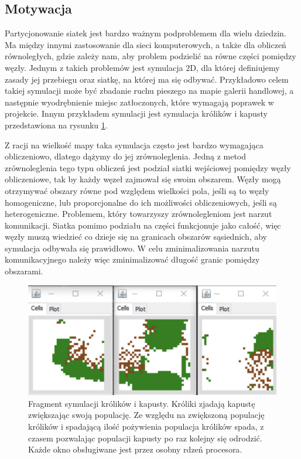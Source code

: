 \subsection{Motywacja}
Partycjonowanie siatek jest bardzo ważnym podproblemem dla wielu dziedzin.
Ma między innymi zastosowanie dla sieci komputerowych, a także dla obliczeń równoległych, gdzie zależy nam,
aby problem podzielić na równe części pomiędzy węzły.
Jednym z takich problemów jest symulacja $2$D, dla której definiujemy zasady jej przebiegu oraz siatkę, na której ma się odbywać.
Przykładowo celem takiej symulacji może być zbadanie ruchu pieszego na mapie galerii handlowej, a następnie wyodrębnienie miejsc
zatłoczonych, które wymagają poprawek w projekcie.
Innym przykładem symulacji jest symulacja królików i kapusty przedstawiona na rysunku \ref{im:kroliki}.

Z racji na wielkość mapy taka symulacja często jest bardzo wymagająca obliczeniowo, dlatego dążymy do jej
zrównoleglenia.
Jedną z metod zrównoleglenia tego typu obliczeń jest podział siatki wejściowej pomiędzy węzły obliczeniowe,
tak by każdy węzeł zajmował się swoim obszarem.
Węzły mogą otrzymywać obszary równe pod względem wielkości pola, jeśli są to węzły homogeniczne, lub proporcjonalne do ich
możliwości obliczeniowych, jeśli są heterogeniczne.
Problemem, który towarzyszy zrównolegleniom jest narzut komunikacji.
Siatka pomimo podziału na części funkcjonuje jako całość, więc węzły muszą wiedzieć co dzieje się na granicach obszarów sąsiednich,
aby symulacja odbywała się prawidłowo.
W celu zminimalizowania narzutu komunikacyjnego należy więc zminimalizować długość granic pomiędzy obszarami.

\begin{figure}[h]
    \centering
    \includegraphics[width=0.6\linewidth]{images/kroliki}
    \caption{Fragment symulacji królików i kapusty. Króliki zjadają kapustę zwiększając swoją populację. Ze względu
    na zwiększoną populację królików i spadającą ilość pożywienia populacja królików spada, z czasem pozwalając
    populacji kapusty po raz kolejny się odrodzić. Każde okno obsługiwane jest przez osobny rdzeń procesora.}
    \label{im:kroliki}
\end{figure}

